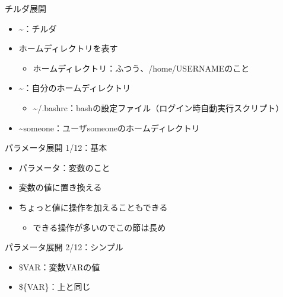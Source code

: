 \documentclass[12pt,aspectratio=169]{beamer}
\begin{document}
\begin{frame}{チルダ展開}

  \begin{itemize}
    \item \~{}：チルダ
    \item ホームディレクトリを表す
      \begin{itemize}
        \item ホームディレクトリ：ふつう、/home/USERNAMEのこと
      \end{itemize}
    \item \~{}：自分のホームディレクトリ
      \begin{itemize}
        \item \~{}/.bashrc：bashの設定ファイル（ログイン時自動実行スクリプト）
      \end{itemize}
    \item \~{}someone：ユーザsomeoneのホームディレクトリ

  \end{itemize}

\end{frame}


\begin{frame}{パラメータ展開 1/12：基本}

  \begin{itemize}
    \item パラメータ：変数のこと
    \item 変数の値に置き換える
    \item ちょっと値に操作を加えることもできる
      \begin{itemize}
        \item できる操作が多いのでこの節は長め
      \end{itemize}
  \end{itemize}

\end{frame}


\begin{frame}{パラメータ展開 2/12：シンプル}

  \begin{itemize}
    \item \$VAR：変数VARの値
    \item \$\{VAR\}：上と同じ
  \end{itemize}

\end{frame}
\end{document}
